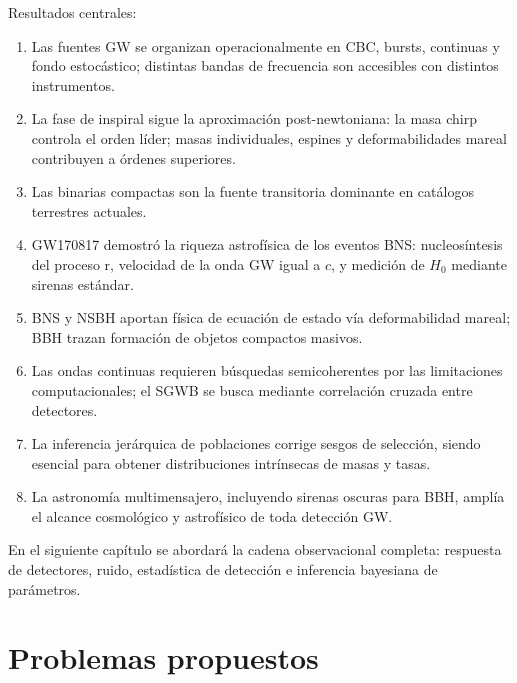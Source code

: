 Resultados centrales:
\begin{enumerate}[leftmargin=2em, label=\textbf{\arabic*.}]
  \item Las fuentes GW se organizan operacionalmente en CBC, bursts, continuas y fondo estocástico; distintas bandas de frecuencia son accesibles con distintos instrumentos.
  \item La fase de inspiral sigue la aproximación post-newtoniana: la masa chirp controla el orden líder; masas individuales, espines y deformabilidades mareal contribuyen a órdenes superiores.
  \item Las binarias compactas son la fuente transitoria dominante en catálogos terrestres actuales.
  \item GW170817 demostró la riqueza astrofísica de los eventos BNS: nucleosíntesis del proceso r, velocidad de la onda GW igual a $c$, y medición de $H_0$ mediante sirenas estándar.
  \item BNS y NSBH aportan física de ecuación de estado vía deformabilidad mareal; BBH trazan formación de objetos compactos masivos.
  \item Las ondas continuas requieren búsquedas semicoherentes por las limitaciones computacionales; el SGWB se busca mediante correlación cruzada entre detectores.
  \item La inferencia jerárquica de poblaciones corrige sesgos de selección, siendo esencial para obtener distribuciones intrínsecas de masas y tasas.
  \item La astronomía multimensajero, incluyendo sirenas oscuras para BBH, amplía el alcance cosmológico y astrofísico de toda detección GW.
\end{enumerate}

En el siguiente capítulo se abordará la cadena observacional completa: respuesta de detectores, ruido, estadística de detección e inferencia bayesiana de parámetros.

\section*{Problemas propuestos}

